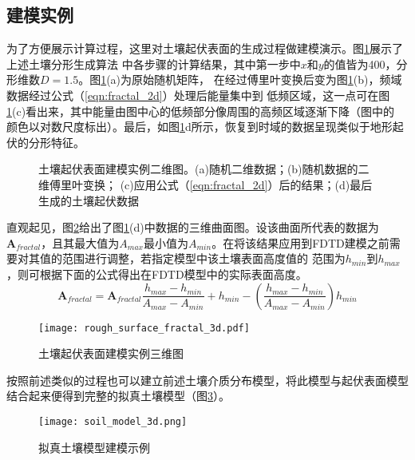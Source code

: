 \subsection{建模实例}
为了方便展示计算过程，这里对土壤起伏表面的生成过程做建模演示。图\ref{rough_surface}展示了上述土壤分形生成算法
中各步骤的计算结果，其中第一步中$x$和$y$的值皆为400，分形维数$D=1.5$。图\ref{rough_surface}(a)为原始随机矩阵，
在经过傅里叶变换后变为图\ref{rough_surface}(b)，频域数据经过公式（\ref{eqn:fractal_2d}）处理后能量集中到
低频区域，这一点可在图\ref{rough_surface}(c)看出来，其中能量由图中心的低频部分像周围的高频区域逐渐下降（图中的
颜色以对数尺度标出）。最后，如图\ref{rough_surface}{d}所示，恢复到时域的数据呈现类似于地形起伏的分形特征。
\begin{figure}[htbp]
	\caption{土壤起伏表面建模实例二维图。(a)随机二维数据；(b)随机数据的二维傅里叶变换；
	(c)应用公式（\ref{eqn:fractal_2d}）后的结果；(d)最后生成的土壤起伏数据}
	\label{rough_surface}
\end{figure}

直观起见，图\ref{rough_surface_3d}给出了图\ref{rough_surface}(d)中数据的三维曲面图。设该曲面所代表的数据为
$\mathbf{A}_{fractal}$，且其最大值为$A_{max}$最小值为$A_{min}$。在将该结果应用到FDTD建模之前需要对其值的范围进行调整，若指定模型中该土壤表面高度值的
范围为$h_{min}$到$h_{max}$，则可根据下面的公式得出在FDTD模型中的实际表面高度。
\begin{equation}
	\mathbf{A}_{fractal} = \mathbf{A}_{fractal} \frac{h_{max} - h_{min}}{A_{max} - A_{min}} + 
		h_{min} - (\frac{h_{max} - h_{min}}{A_{max} - A_{min}}) h_{min}
\end{equation}
\begin{figure}[htbp]
	\texttt{[image: rough\_surface\_fractal\_3d.pdf]}
	\caption[]{土壤起伏表面建模实例三维图}
	\label{rough_surface_3d}
\end{figure}

按照前述类似的过程也可以建立前述土壤介质分布模型，将此模型与起伏表面模型结合起来便得到完整的拟真土壤模型（图\ref{soil_model_3d}）。


\begin{figure}[htbp]
	\texttt{[image: soil\_model\_3d.png]}
	\caption{拟真土壤模型建模示例}
	\label{soil_model_3d}
\end{figure}
